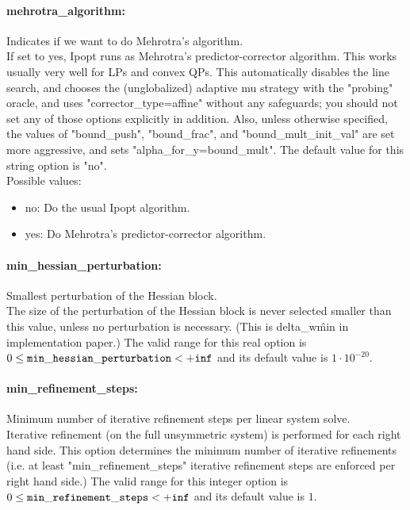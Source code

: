 \paragraph{mehrotra\_algorithm:}\label{sec:mehrotra_algorithm} Indicates if we want to do Mehrotra's algorithm. $\;$ \\
 If set to yes, Ipopt runs as Mehrotra's
predictor-corrector algorithm. This works usually
very well for LPs and convex QPs.  This
automatically disables the line search, and
chooses the (unglobalized) adaptive mu strategy
with the "probing" oracle, and uses
"corrector\_type=affine" without any safeguards;
you should not set any of those options
explicitly in addition.  Also, unless otherwise
specified, the values of "bound\_push",
"bound\_frac", and "bound\_mult\_init\_val" are
set more aggressive, and sets
"alpha\_for\_y=bound\_mult".
The default value for this string option is "no".
\\ 
Possible values:
\begin{itemize}
   \item no: Do the usual Ipopt algorithm.
   \item yes: Do Mehrotra's predictor-corrector algorithm.
\end{itemize}

\paragraph{min\_hessian\_perturbation:}\label{sec:min_hessian_perturbation} Smallest perturbation of the Hessian block. $\;$ \\
 The size of the perturbation of the Hessian block
is never selected smaller than this value, unless
no perturbation is necessary. (This is
delta\_w\^min in implementation paper.) The valid range for this real option is 
$0 \le {\tt min\_hessian\_perturbation } <  {\tt +inf}$
and its default value is $1 \cdot 10^{-20}$.


\paragraph{min\_refinement\_steps:}\label{sec:min_refinement_steps} Minimum number of iterative refinement steps per linear system solve. $\;$ \\
 Iterative refinement (on the full unsymmetric
system) is performed for each right hand side. 
This option determines the minimum number of
iterative refinements (i.e. at least
"min\_refinement\_steps" iterative refinement
steps are enforced per right hand side.) The valid range for this integer option is
$0 \le {\tt min\_refinement\_steps } <  {\tt +inf}$
and its default value is $1$.


